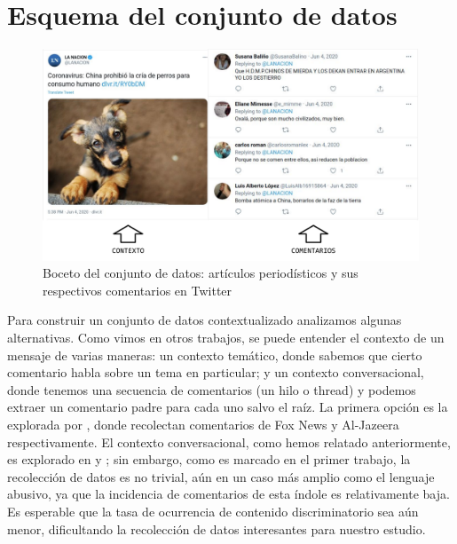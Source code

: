 \section{Esquema del conjunto de datos}



\begin{figure}[t]
    \centering
    \includegraphics[width=\textwidth]{img/idea_dataset.pdf}
    \caption{Boceto del conjunto de datos: artículos periodísticos y sus respectivos comentarios en Twitter}
    \label{fig:idea_dataset}
\end{figure}

Para construir un conjunto de datos contextualizado analizamos algunas alternativas. Como vimos en otros trabajos, se puede entender el contexto de un mensaje de varias maneras: un contexto temático, donde sabemos que cierto comentario habla sobre un tema en particular; y un contexto conversacional, donde tenemos una secuencia de comentarios (un hilo o thread) y podemos extraer un comentario padre para cada uno salvo el raíz. La primera opción es la explorada por \citet{gao-huang-2017-detecting,mubarak-etal-2017-abusive}, donde recolectan comentarios de Fox News y Al-Jazeera respectivamente. El contexto conversacional, como hemos relatado anteriormente, es explorado en \citet{pavlopoulos2020toxicity} y \citet{xenos-2021-context}; sin embargo, como es marcado en el primer trabajo, la recolección de datos es no trivial, aún en un caso más amplio como el lenguaje abusivo, ya que la incidencia de comentarios de esta índole es relativamente baja. Es esperable que la tasa de ocurrencia de contenido discriminatorio sea aún menor, dificultando la recolección de datos interesantes para nuestro estudio.

